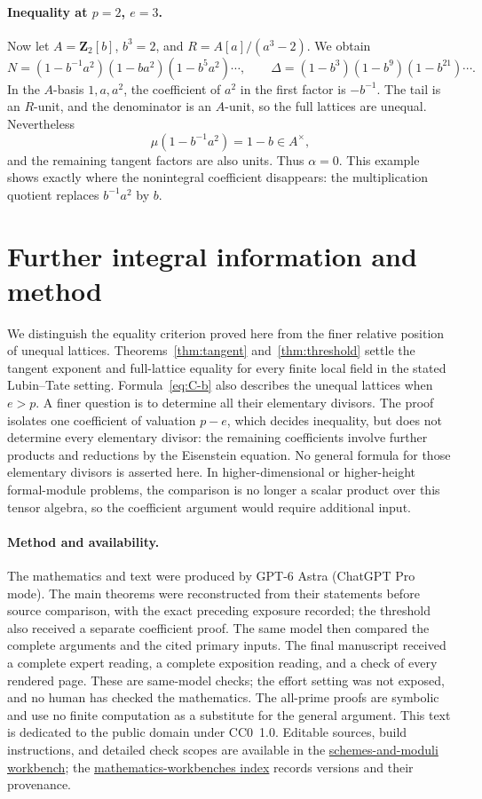 \documentclass[11pt]{article}
\theoremstyle{definition}\newtheorem{definition}[theorem]{Definition}
\theoremstyle{remark}\newtheorem{remark}[theorem]{Remark}
\newcommand{\ZZ}{\mathbf Z}
\newcommand{\workbenchurl}{https://github.com/KokunoYumeto/schemes-and-moduli-workbench}
\newcommand{\recordurl}{https://github.com/KokunoYumeto/mathematics-workbenches}
\begin{document}
\paragraph{Inequality at $p=2$, $e=3$.}
Now let $A=\ZZ_2[b]$, $b^3=2$, and $R=A[a]/(a^3-2)$. We obtain
\[
 N=(1-b^{-1}a^2)(1-ba^2)(1-b^5a^2)\cdots,
 \qquad
 \Delta=(1-b^3)(1-b^9)(1-b^{21})\cdots.
\]
In the $A$-basis $1,a,a^2$, the coefficient of $a^2$ in the first factor is $-b^{-1}$. The tail is an $R$-unit, and the denominator is an $A$-unit, so the full lattices are unequal. Nevertheless
\[
 \mu(1-b^{-1}a^2)=1-b\in A^\times,
\]
and the remaining tangent factors are also units. Thus $\alpha=0$. This example shows exactly where the nonintegral coefficient disappears: the multiplication quotient replaces $b^{-1}a^2$ by $b$.

\section{Further integral information and method}\label{sec:scope}

We distinguish the equality criterion proved here from the finer relative position of unequal lattices. Theorems~\ref{thm:tangent} and~\ref{thm:threshold} settle the tangent exponent and full-lattice equality for every finite local field in the stated Lubin--Tate setting. Formula~\eqref{eq:C-b} also describes the unequal lattices when $e>p$. A finer question is to determine all their elementary divisors. The proof isolates one coefficient of valuation $p-e$, which decides inequality, but does not determine every elementary divisor: the remaining coefficients involve further products and reductions by the Eisenstein equation. No general formula for those elementary divisors is asserted here. In higher-dimensional or higher-height formal-module problems, the comparison is no longer a scalar product over this tensor algebra, so the coefficient argument would require additional input.

\paragraph{Method and availability.}
The mathematics and text were produced by GPT-6 Astra (ChatGPT Pro mode). The main theorems were reconstructed from their statements before source comparison, with the exact preceding exposure recorded; the threshold also received a separate coefficient proof. The same model then compared the complete arguments and the cited primary inputs. The final manuscript received a complete expert reading, a complete exposition reading, and a check of every rendered page. These are same-model checks; the effort setting was not exposed, and no human has checked the mathematics. The all-prime proofs are symbolic and use no finite computation as a substitute for the general argument. This text is dedicated to the public domain under CC0~1.0. Editable sources, build instructions, and detailed check scopes are available in the \href{\workbenchurl}{schemes-and-moduli workbench}; the \href{\recordurl}{mathematics-workbenches index} records versions and their provenance.
\end{document}
